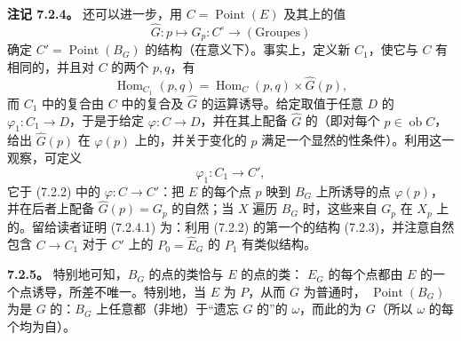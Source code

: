 \textbf{注记 7.2.4。} 还可以进一步，用 $C=\operatorname{Point}(E)$ 及其上的值
\[\widehat G:p\longmapsto G_p:C^\circ\longrightarrow(\mathrm{Groupes})\]
确定 $C'=\operatorname{Point}(B_G)$ 的结构（在意义下）。事实上，定义新 $C_1$，使它与 $C$ 有相同的，并且对 $C$ 的两个 $p,q$，有
\[\operatorname{Hom}_{C_1}(p,q)=\operatorname{Hom}_C(p,q)\times\widehat G(p),\]
而 $C_1$ 中的复合由 $C$ 中的复合及 $\widehat G$ 的运算诱导。给定取值于任意 $D$ 的 $\varphi_1:C_1\to D$，于是于给定 $\varphi:C\to D$，并在其上配备 $\widehat G$ 的（即对每个 $p\in\operatorname{ob}C$，给出 $\widehat G(p)$ 在 $\varphi(p)$ 上的，并关于变化的 $p$ 满足一个显然的性条件）。利用这一观察，可定义
\[\varphi_1:C_1\longrightarrow C',\tag{7.2.4.1}\]
它于 (7.2.2) 中的 $\varphi:C\to C'$：把 $E$ 的每个点 $p$ 映到 $B_G$ 上所诱导的点 $\varphi(p)$，并在后者上配备 $\widehat G(p)=G_p$ 的自然；当 $X$ 遍历 $B_G$ 时，这些来自 $G_p$ 在 $X_p$ 上的。留给读者证明 (7.2.4.1) 为：利用 (7.2.2) 的第一个的结构 (7.2.3)，并注意自然包含 $C\to C_1$ 对于 $C'$ 上的 $P_0=\widehat E_G$ 的 $P_1$ 有类似结构。

\textbf{7.2.5。} 特别地可知，$B_G$ 的点的类恰与 $E$ 的点的类： $E_G$ 的每个点都由 $E$ 的一个点诱导，所差不唯一。特别地，当 $E$ 为 $P$，从而 $G$ 为普通时， $\operatorname{Point}(B_G)$ 为是 $G$ 的：$B_G$ 上任意都（非地）于“遗忘 $G$ 的”的 $\omega$，而此的为 $G$（所以 $\omega$ 的每个均为自）。

